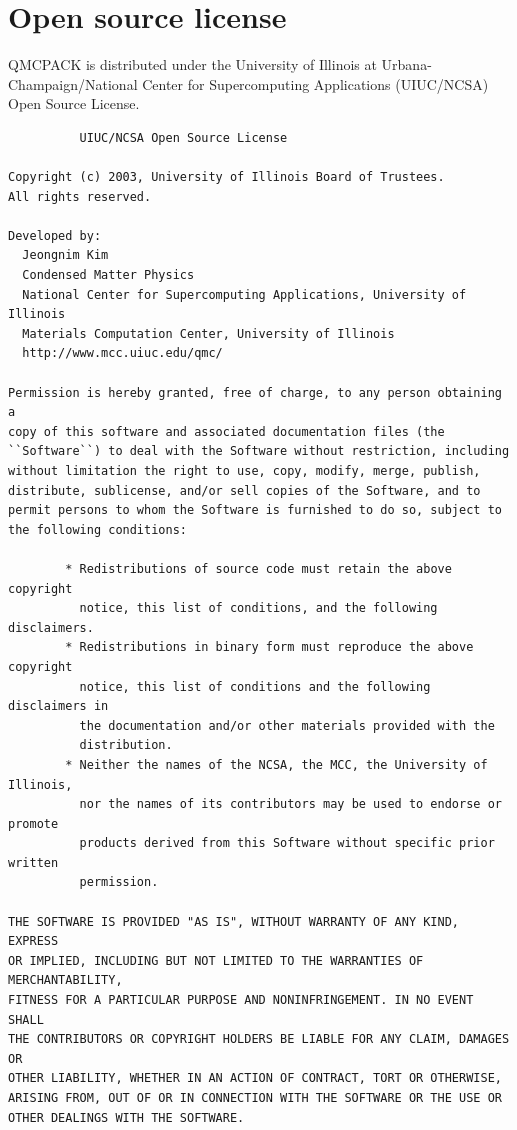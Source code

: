 \section{Open source license}
\label{sec:license}

QMCPACK is distributed under the University of Illinois at
Urbana-Champaign/National Center for Supercomputing Applications (UIUC/NCSA) Open
Source License. 

\begin{verbatim}
		  UIUC/NCSA Open Source License

Copyright (c) 2003, University of Illinois Board of Trustees.
All rights reserved.

Developed by:   
  Jeongnim Kim
  Condensed Matter Physics
  National Center for Supercomputing Applications, University of Illinois
  Materials Computation Center, University of Illinois
  http://www.mcc.uiuc.edu/qmc/

Permission is hereby granted, free of charge, to any person obtaining a
copy of this software and associated documentation files (the
``Software``) to deal with the Software without restriction, including
without limitation the right to use, copy, modify, merge, publish,
distribute, sublicense, and/or sell copies of the Software, and to
permit persons to whom the Software is furnished to do so, subject to
the following conditions:

        * Redistributions of source code must retain the above copyright 
          notice, this list of conditions, and the following disclaimers.
        * Redistributions in binary form must reproduce the above copyright 
          notice, this list of conditions and the following disclaimers in 
          the documentation and/or other materials provided with the 
          distribution.
        * Neither the names of the NCSA, the MCC, the University of Illinois, 
          nor the names of its contributors may be used to endorse or promote 
          products derived from this Software without specific prior written 
          permission.

THE SOFTWARE IS PROVIDED "AS IS", WITHOUT WARRANTY OF ANY KIND, EXPRESS
OR IMPLIED, INCLUDING BUT NOT LIMITED TO THE WARRANTIES OF MERCHANTABILITY, 
FITNESS FOR A PARTICULAR PURPOSE AND NONINFRINGEMENT. IN NO EVENT SHALL 
THE CONTRIBUTORS OR COPYRIGHT HOLDERS BE LIABLE FOR ANY CLAIM, DAMAGES OR 
OTHER LIABILITY, WHETHER IN AN ACTION OF CONTRACT, TORT OR OTHERWISE, 
ARISING FROM, OUT OF OR IN CONNECTION WITH THE SOFTWARE OR THE USE OR 
OTHER DEALINGS WITH THE SOFTWARE.
\end{verbatim}

